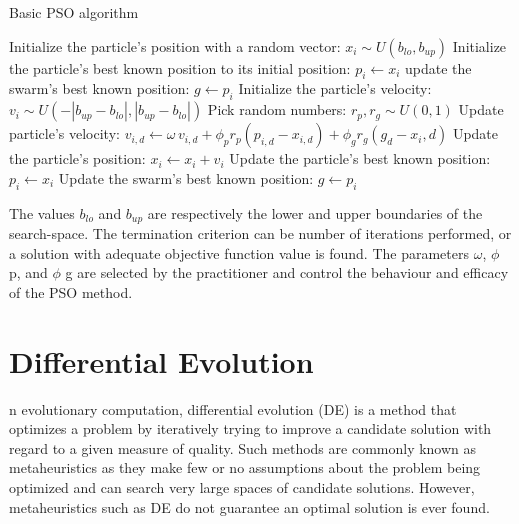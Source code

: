 \documentclass[11pt, a4paper]{report}
\begin{document}
\begin{algorithm}
	\caption{Basic PSO algorithm}\label{algo:pso}
	\begin{algorithmic}[1]
		\State Initialize the particle's position with a random vector: $ x_{i} \sim U(b_{lo}, b_{up}) $
		\State Initialize the particle's best known position to its initial position: $ p_{i} \gets x_{i} $
		\State update the swarm's best known  position: $ g \gets p_{i} $
		\EndIf
		\State Initialize the particle's velocity: $ v_{i} \sim  U(-|b_{up}-b_{lo}|, |b_{up}-b_{lo}|) $
		\State Pick random numbers: $ r_{p}, r_{g} \sim U(0,1) $
		\State          Update particle's velocity: $ v_{i,d} \gets \omega\, v_{i,d} + \phi_{p} r_{p} (p_{i,d}-x_{i,d}) + \phi_{g} r_{g} (g_{d}-x_{i},d) $
		\State Update the particle's position: $ x_{i} \gets x_{i} + v_{i} $
		\State Update the particle's best known position: $ p_{i} ← x_{i} $
		\State Update the swarm's best known position: $ g \gets p_{i} $
		\EndIf
		\EndIf
		\EndFor
		\EndFor
		\EndWhile
		\EndFor
	\end{algorithmic}
\end{algorithm}

The values $ b_{lo} $ and $ b_{up} $ are respectively the lower and upper boundaries of the search-space. The termination criterion can be number of iterations performed, or a solution with adequate objective function value is found. The parameters $ \omega $, $ \phi $ p, and $ \phi $ g are selected by the practitioner and control the behaviour and efficacy of the PSO method. \cite{wiki:pso}
\newpage


\section{Differential Evolution}
n evolutionary computation, differential evolution (DE) is a method that optimizes a problem by iteratively trying to improve a candidate solution with regard to a given measure of quality. Such methods are commonly known as metaheuristics as they make few or no assumptions about the problem being optimized and can search very large spaces of candidate solutions. However, metaheuristics such as DE do not guarantee an optimal solution is ever found. \\
\end{document}
